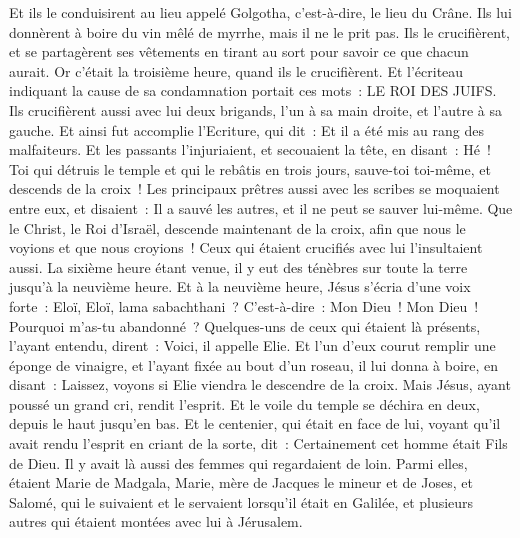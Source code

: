 \begin{multicols}{2}
Et ils le conduisirent au lieu appelé Golgotha, c'est-à-dire, le lieu du Crâne.
Ils lui donnèrent à boire du vin mêlé de myrrhe, mais il ne le prit pas.
Ils le crucifièrent, et se partagèrent ses vêtements en tirant au sort pour savoir ce que chacun aurait.
Or c'était la troisième heure, quand ils le crucifièrent.
Et l'écriteau indiquant la cause de sa condamnation portait ces mots~: LE ROI DES JUIFS.
Ils crucifièrent aussi avec lui deux brigands, l'un à sa main droite, et l'autre à sa gauche.
Et ainsi fut accomplie l'Ecriture, qui dit~: Et il a été mis au rang des malfaiteurs.
Et les passants l'injuriaient, et secouaient la tête, en disant~: Hé~! Toi qui détruis le temple et qui le rebâtis en trois jours,
sauve-toi toi-même, et descends de la croix~!
Les principaux prêtres aussi avec les scribes se moquaient entre eux, et disaient~: Il a sauvé les autres, et il ne peut se sauver lui-même.
Que le Christ, le Roi d'Israël, descende maintenant de la croix, afin que nous le voyions et que nous croyions~! Ceux qui étaient crucifiés avec lui l'insultaient aussi.
La sixième heure étant venue, il y eut des ténèbres sur toute la terre jusqu'à la neuvième heure.
Et à la neuvième heure, Jésus s'écria d'une voix forte~: Eloï, Eloï, lama sabachthani~? C'est-à-dire~: Mon Dieu~! Mon Dieu~! Pourquoi m'as-tu abandonné~?
Quelques-uns de ceux qui étaient là présents, l'ayant entendu, dirent~: Voici, il appelle Elie.
Et l'un d'eux courut remplir une éponge de vinaigre, et l'ayant fixée au bout d'un roseau, il lui donna à boire, en disant~: Laissez, voyons si Elie viendra le descendre de la croix.
Mais Jésus, ayant poussé un grand cri, rendit l'esprit.
Et le voile du temple se déchira en deux, depuis le haut jusqu'en bas.
Et le centenier, qui était en face de lui, voyant qu'il avait rendu l'esprit en criant de la sorte, dit~: Certainement cet homme était Fils de Dieu.
Il y avait là aussi des femmes qui regardaient de loin. Parmi elles, étaient Marie de Madgala, Marie, mère de Jacques le mineur et de Joses, et Salomé,
qui le suivaient et le servaient lorsqu'il était en Galilée, et plusieurs autres qui étaient montées avec lui à Jérusalem.

\end{multicols}
